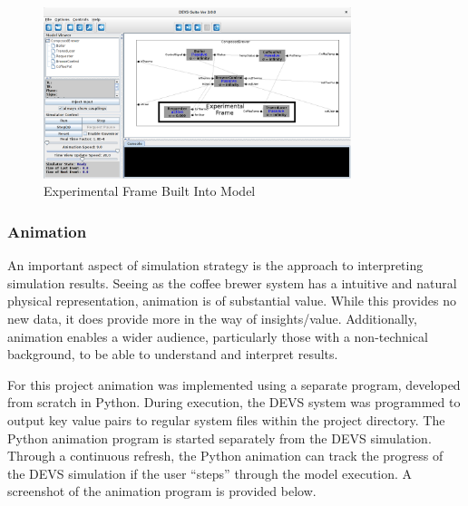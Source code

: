 \documentclass[10pt]{article}
\begin{document}
\begin{center}
  \begin{figure}[H]
    \begin{center}
      \includegraphics[width=0.8\textwidth]{input/ef-introduced}
      \caption{Experimental Frame Built Into Model}
      \label{ref:ef-introduced}
    \end{center}
  \end{figure}
\end{center}


\subsubsection{Animation}
An important aspect of simulation strategy is the approach to interpreting simulation results.  Seeing as the coffee brewer system has a intuitive and natural physical representation, animation is of substantial value.  While this provides no new data, it does provide more in the way of insights/value.  Additionally, animation enables a wider audience, particularly those with a non-technical background, to be able to understand and interpret results.

For this project animation was implemented using a separate program, developed from scratch in Python.  During execution, the DEVS system was programmed to output key value pairs to regular system files within the project directory.  The Python animation program is started separately from the DEVS simulation.  Through a continuous refresh, the Python animation can track the progress of the DEVS simulation if the user ``steps'' through the model execution.  A screenshot of the animation program is provided below.
\end{document}
